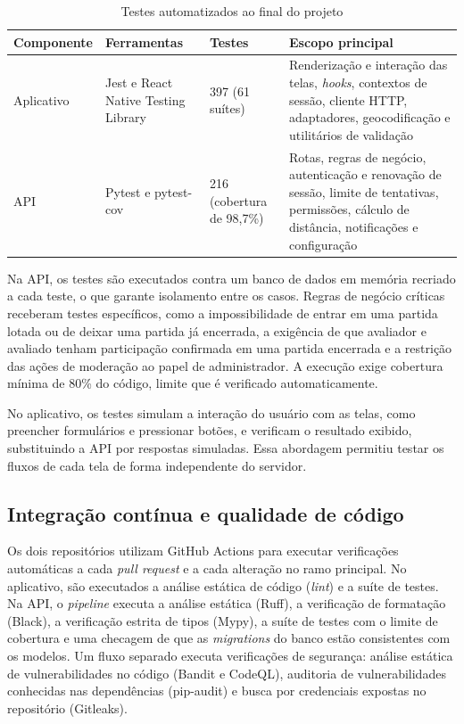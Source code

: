 \documentclass[a4paper, 12pt]{article}
\begin{document}
\begin{justify}
\begin{table}[H]
\centering
\caption{Testes automatizados ao final do projeto}
\label{tab:testes}
\small
\begin{tabular}{|p{2.6cm}|p{3.4cm}|p{2.2cm}|p{5.4cm}|}
\hline
\textbf{Componente} & \textbf{Ferramentas} & \textbf{Testes} & \textbf{Escopo principal} \\
\hline
Aplicativo & Jest e React Native Testing Library & 397 (61 suítes) & Renderização e interação das telas, \textit{hooks}, contextos de sessão, cliente HTTP, adaptadores, geocodificação e utilitários de validação \\
\hline
API & Pytest e pytest-cov & 216 (cobertura de 98,7\%) & Rotas, regras de negócio, autenticação e renovação de sessão, limite de tentativas, permissões, cálculo de distância, notificações e configuração \\
\hline
\end{tabular}
\end{table}

Na API, os testes são executados contra um banco de dados em memória recriado a cada teste, o que garante isolamento entre os casos. Regras de negócio críticas receberam testes específicos, como a impossibilidade de entrar em uma partida lotada ou de deixar uma partida já encerrada, a exigência de que avaliador e avaliado tenham participação confirmada em uma partida encerrada e a restrição das ações de moderação ao papel de administrador. A execução exige cobertura mínima de 80\% do código, limite que é verificado automaticamente.

No aplicativo, os testes simulam a interação do usuário com as telas, como preencher formulários e pressionar botões, e verificam o resultado exibido, substituindo a API por respostas simuladas. Essa abordagem permitiu testar os fluxos de cada tela de forma independente do servidor.

\subsection{Integração contínua e qualidade de código}

Os dois repositórios utilizam GitHub Actions para executar verificações automáticas a cada \textit{pull request} e a cada alteração no ramo principal. No aplicativo, são executados a análise estática de código (\textit{lint}) e a suíte de testes. Na API, o \textit{pipeline} executa a análise estática (Ruff), a verificação de formatação (Black), a verificação estrita de tipos (Mypy), a suíte de testes com o limite de cobertura e uma checagem de que as \textit{migrations} do banco estão consistentes com os modelos. Um fluxo separado executa verificações de segurança: análise estática de vulnerabilidades no código (Bandit e CodeQL), auditoria de vulnerabilidades conhecidas nas dependências (pip-audit) e busca por credenciais expostas no repositório (Gitleaks).


\end{justify}
\end{document}
